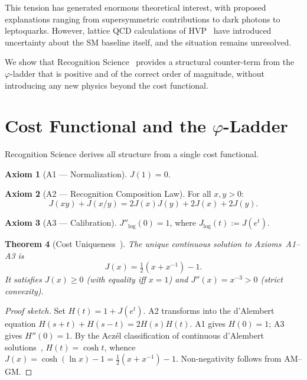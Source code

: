 \documentclass[12pt,a4paper]{article}
\newtheorem{theorem}{Theorem}[section]
\theoremstyle{definition}
\newtheorem{axiom_rs}[theorem]{Axiom}
\theoremstyle{remark}
\begin{document}
This tension has generated enormous theoretical interest, with proposed
explanations ranging from supersymmetric contributions to dark photons to
leptoquarks.  However, lattice QCD calculations of HVP~\cite{BMW2021}
have introduced uncertainty about the SM baseline itself, and the
situation remains unresolved.

We show that Recognition Science~\cite{RS_Axioms} provides a structural
counter-term from the $\varphi$-ladder that is positive and of the
correct order of magnitude, without introducing any new physics beyond
the cost functional.

\section{Cost Functional and the $\varphi$-Ladder}
\label{sec:background}

Recognition Science derives all structure from a single cost functional.

\begin{axiom_rs}[A1 --- Normalization]
$J(1) = 0$.
\end{axiom_rs}

\begin{axiom_rs}[A2 --- Recognition Composition Law]
For all $x, y > 0$:
\begin{equation}
  J(xy) + J(x/y) = 2J(x)J(y) + 2J(x) + 2J(y).
\end{equation}
\end{axiom_rs}

\begin{axiom_rs}[A3 --- Calibration]
$J''_{\log}(0) = 1$, where $J_{\log}(t) := J(e^t)$.
\end{axiom_rs}

\begin{theorem}[Cost Uniqueness~\cite{RS_Axioms}]
\label{thm:J}
The unique continuous solution to Axioms~A1--A3 is
\[
  J(x) = \tfrac{1}{2}(x + x^{-1}) - 1.
\]
It satisfies $J(x) \geq 0$ (with equality iff $x = 1$) and
$J''(x) = x^{-3} > 0$ (strict convexity).
\end{theorem}

\begin{proof}[Proof sketch]
Set $H(t) = 1 + J(e^t)$.  A2 transforms into the d'Alembert equation
$H(s+t) + H(s-t) = 2H(s)H(t)$.  A1 gives $H(0)=1$; A3 gives
$H''(0) = 1$.  By the Acz\'el classification of continuous d'Alembert
solutions~\cite{Aczel1966}, $H(t) = \cosh t$, whence
$J(x) = \cosh(\ln x) - 1 = \tfrac{1}{2}(x + x^{-1}) - 1$.
Non-negativity follows from AM--GM.
\end{proof}
\end{document}
